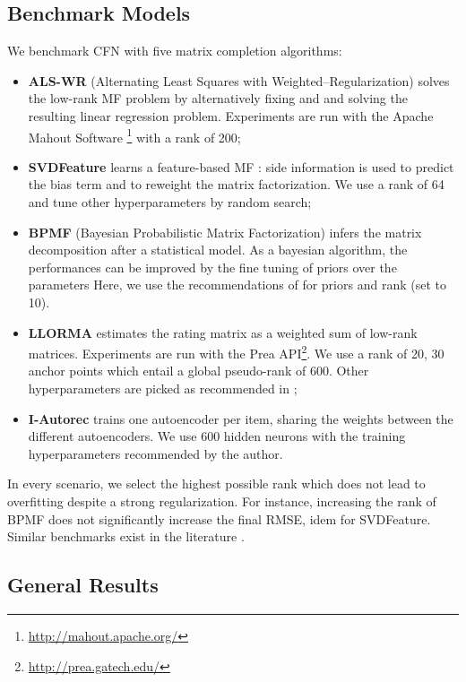 \documentclass{article}
\begin{document}
\subsection{Benchmark Models}
We benchmark CFN with five matrix completion algorithms:
\begin{itemize}\item
{\bf ALS-WR} (Alternating Least Squares with Weighted--Regularization) \cite{Zhou2008} solves the low-rank MF problem by alternatively fixing  and  and solving the resulting linear regression problem. Experiments are run with the Apache Mahout Software \footnote{\url{http://mahout.apache.org/}} with a rank of 200;
 \item {\bf SVDFeature} \cite{Chen2012} learns a feature-based MF : side information is used to predict the bias term and to reweight the matrix factorization. We use a rank of 64 and tune other hyperparameters by random search;
  \item {\bf BPMF} (Bayesian Probabilistic Matrix Factorization)  infers the matrix decomposition after a statistical model. As a bayesian algorithm, the performances can be improved by the fine tuning of priors over the parameters Here, we use the recommendations of \cite{Salakhutdinov2008} for priors and rank (set to 10).\item {\bf LLORMA}  estimates the rating matrix as a weighted sum of low-rank matrices. Experiments are run with the Prea API\footnote{\url{http://prea.gatech.edu/}}. We use a rank of 20, 30 anchor points which entail a global pseudo-rank of 600. Other hyperparameters are picked as recommended in \cite{Lee2013};
 \item {\bf I-Autorec} \cite{Sedhain2015} trains one autoencoder per item, sharing the weights between the different autoencoders. We use 600 hidden neurons with the training hyperparameters recommended by the author.
\end{itemize}
In every scenario, we select the highest possible rank which does not lead to overfitting despite a strong regularization. For instance, increasing the rank of BPMF does not significantly increase the final RMSE, idem for SVDFeature. Similar benchmarks exist in the literature \cite{Lee2013,Li2016,Zheng2016}.


\subsection{General Results} 
\end{document}
